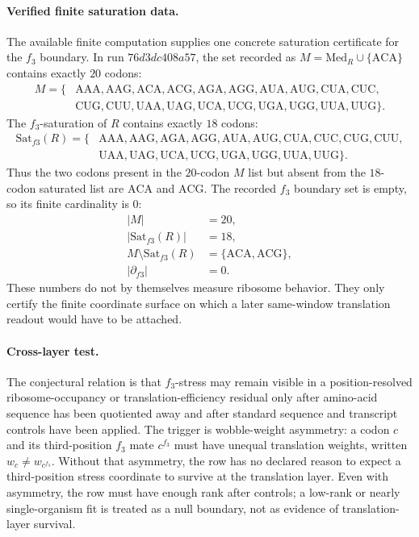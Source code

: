 \paragraph{Verified finite saturation data.}
The available finite computation supplies one concrete saturation certificate for the $f_3$ boundary.  In run $76d3dc408a57$, the set recorded as $M=\mathrm{Med}_R\cup\{\mathrm{ACA}\}$ contains exactly $20$ codons:
$$
\begin{aligned}
M=\{&\mathrm{AAA},\mathrm{AAG},\mathrm{ACA},\mathrm{ACG},\mathrm{AGA},\mathrm{AGG},\mathrm{AUA},\mathrm{AUG},\mathrm{CUA},\mathrm{CUC},\\
&\mathrm{CUG},\mathrm{CUU},\mathrm{UAA},\mathrm{UAG},\mathrm{UCA},\mathrm{UCG},\mathrm{UGA},\mathrm{UGG},\mathrm{UUA},\mathrm{UUG}\}.
\end{aligned}
$$
The $f_3$-saturation of $R$ contains exactly $18$ codons:
$$
\begin{aligned}
\mathrm{Sat}_{f3}(R)=\{&\mathrm{AAA},\mathrm{AAG},\mathrm{AGA},\mathrm{AGG},\mathrm{AUA},\mathrm{AUG},\mathrm{CUA},\mathrm{CUC},\mathrm{CUG},\mathrm{CUU},\\
&\mathrm{UAA},\mathrm{UAG},\mathrm{UCA},\mathrm{UCG},\mathrm{UGA},\mathrm{UGG},\mathrm{UUA},\mathrm{UUG}\}.
\end{aligned}
$$
Thus the two codons present in the $20$-codon $M$ list but absent from the $18$-codon saturated list are $\mathrm{ACA}$ and $\mathrm{ACG}$.  The recorded $f_3$ boundary set is empty, so its finite cardinality is $0$:
$$
\begin{aligned}
|M|&=20,\\
|\mathrm{Sat}_{f3}(R)|&=18,\\
M\setminus \mathrm{Sat}_{f3}(R)&=\{\mathrm{ACA},\mathrm{ACG}\},\\
|\partial_{f3}|&=0.
\end{aligned}
$$
These numbers do not by themselves measure ribosome behavior.  They only certify the finite coordinate surface on which a later same-window translation readout would have to be attached.

\paragraph{Cross-layer test.}
The conjectural relation is that $f_3$-stress may remain visible in a position-resolved ribosome-occupancy or translation-efficiency residual only after amino-acid sequence has been quotiented away and after standard sequence and transcript controls have been applied.  The trigger is wobble-weight asymmetry: a codon $c$ and its third-position $f_3$ mate $c^{f_3}$ must have unequal translation weights, written $w_c\ne w_{c^{f_3}}$.  Without that asymmetry, the row has no declared reason to expect a third-position stress coordinate to survive at the translation layer.  Even with asymmetry, the row must have enough rank after controls; a low-rank or nearly single-organism fit is treated as a null boundary, not as evidence of translation-layer survival.

